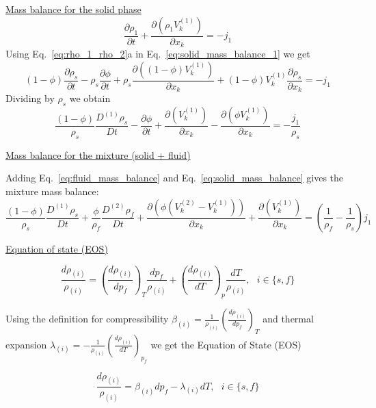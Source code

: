 \documentclass[]{scrreprt}
\begin{document}
\underline{Mass balance for the solid phase}
\begin{equation}
  \label{eq:solid_mass_balance_1}
  \frac{\partial \rho_1}{\partial t} + \frac{\partial( \rho_1 V^{(1)}_k)}{\partial x_k}= -j_1
\end{equation}
Using Eq.~\ref{eq:rho_1_rho_2}a in Eq.~\ref{eq:solid_mass_balance_1} we get
\begin{equation}
  \label{eq:solid_mass_balance_2}
  (1-\phi) \frac{\partial \rho_s }{\partial t} - \rho_s\frac{\partial \phi }{\partial t} + \rho_s\frac{\partial( (1-\phi) V^{(1)}_k)}{\partial x_k}+ (1-\phi) V^{(1)}_k\frac{\partial\rho_s}{\partial x_k} = -j_1
\end{equation}
Dividing by $\rho_s$ we obtain
\begin{equation}
  \label{eq:solid_mass_balance}
  \frac{(1-\phi)}{\rho_s} \frac{D^{(1)} \rho_s }{D t} - \frac{\partial \phi }{\partial t} + \frac{\partial(V^{(1)}_k)}{\partial x_k} - \frac{\partial( \phi V^{(1)}_k)}{\partial x_k} = -\frac{j_1}{\rho_s}
\end{equation}

\underline{Mass balance for the mixture (solid + fluid)}

Adding Eq.~\ref{eq:fluid_mass_balance} and Eq.~\ref{eq:solid_mass_balance} gives the mixture mass balance:
\begin{equation}
  \label{eq:mixture_mass_balance}
  \frac{(1-\phi)}{\rho_s} \frac{D^{(1)} \rho_s }{D t} +\frac{\phi}{\rho_f} \frac{D^{(2)} \rho_f }{D t} + \frac{\partial( \phi (V^{(2)}_k -V^{(1)}_k))}{\partial x_k}+ \frac{\partial(V^{(1)}_k)}{\partial x_k}  = \left(\frac{1}{\rho_f} - \frac{1}{\rho_s}\right)j_1
\end{equation}

\underline{Equation of state (EOS)}

\begin{equation}
  \label{eq:density_derivative}
  \frac{d\rho_{(i)}}{\rho_{(i)}} = \left( \frac{d\rho_{(i)}}{dp_f} \right)_T \frac{dp_f}{\rho_{(i)}} +\left( \frac{d\rho_{(i)}}{dT} \right)_p \frac{dT}{\rho_{(i)}}, \:\:\:i\in \{s,f\} 
\end{equation}

Using the definition for compressibility $\beta_{(i)}=\frac{1}{\rho_{(i)}}\left( \frac{d\rho_{(i)}}{dp_f} \right)_T$ and thermal expansion $\lambda_{(i)}=-\frac{1}{\rho_{(i)}}\left( \frac{d\rho_{(i)}}{dT} \right)_{p_f}$ we get the Equation of State (EOS)

\begin{equation}
  \label{eq:eos_def}
  \frac{d\rho_{(i)}}{\rho_{(i)}} = \beta_{(i)} dp_f - \lambda_{(i)} dT, \:\:\:i\in \{s,f\} 
\end{equation}
\end{document}
